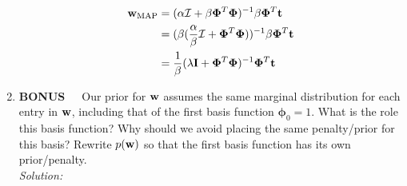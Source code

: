 \documentclass[12pt,a4paper]{article}
\newcommand{\tscalar}{t}
\newcommand{\tvec}{{\bf \tscalar}}
\newcommand{\wscalar}{w}
\newcommand{\wvec}{{\bf \wscalar}}
\newcommand{\wvecMAP}{\wvec_{\text{MAP}}}
\newcommand{\phivec}{\boldsymbol{\phi}}
\begin{document}
\begin{enumerate}
		  \begin{align*}
		  \wvecMAP &= (\alpha \mathcal{I} + \beta \mathbf{\Phi}^T\mathbf{\Phi})^{-1} \beta\mathbf{\Phi}^T\tvec\\
		  &=(\beta (\frac{\alpha}{\beta}\mathcal{I} + \mathbf{\Phi}^T\mathbf{\Phi}))^{-1} \beta\mathbf{\Phi}^T \tvec\\
		  &= \frac{1}{\beta}(\lambda \mathbf{I} + \mathbf{\Phi}^T\mathbf{\Phi})^{-1}\mathbf{\Phi}^T\tvec
		  \end{align*}
  
  \item {\bf BONUS}~~~Our prior for $\wvec$ assumes the same marginal distribution for each entry in $\wvec$, including that of the first basis function $\phivec_0 = 1$.  What is the role this basis function?  Why should we avoid placing the same penalty/prior for this basis?  Rewrite $p(\wvec)$ so that the first basis function has its own prior/penalty. \\
	  \emph{Solution:} \\
  
  
\end{enumerate}

\vspace{0.25in}
\end{document}
